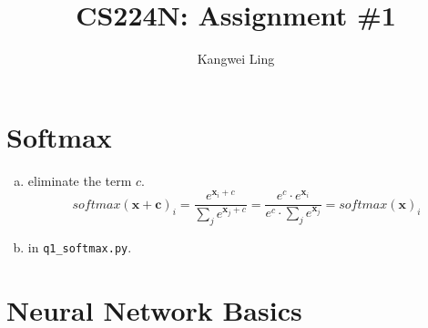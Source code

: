 \documentclass[11pt]{article}
\title{CS224N: Assignment \#1}
\author{Kangwei Ling}
\begin{document}
\maketitle

\section{Softmax}
\label{sec:1}

\begin{enumerate}[(a)]
\item eliminate the term $c$.
  \[
    softmax(\bm{x + c})_i = \dfrac{e^{\bm{x}_i + c}}{\sum_je^{\bm{x}_j + c}} =
    \dfrac{e^c\cdot e^{\bm{x}_i}}{e^c\cdot \sum_je^{\bm{x}_j}} = softmax(\bm{x})_i 
  \]
\item in \verb|q1_softmax.py|.
\end{enumerate}

\section{Neural Network Basics}
\label{sec:2}
\end{document}
